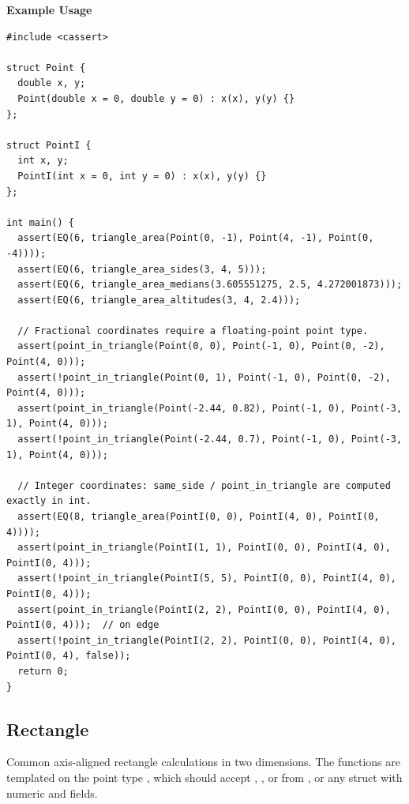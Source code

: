 \textbf{Example Usage}\par
\begin{lstlisting}[style=cpp]
#include <cassert>

struct Point {
  double x, y;
  Point(double x = 0, double y = 0) : x(x), y(y) {}
};

struct PointI {
  int x, y;
  PointI(int x = 0, int y = 0) : x(x), y(y) {}
};

int main() {
  assert(EQ(6, triangle_area(Point(0, -1), Point(4, -1), Point(0, -4))));
  assert(EQ(6, triangle_area_sides(3, 4, 5)));
  assert(EQ(6, triangle_area_medians(3.605551275, 2.5, 4.272001873)));
  assert(EQ(6, triangle_area_altitudes(3, 4, 2.4)));

  // Fractional coordinates require a floating-point point type.
  assert(point_in_triangle(Point(0, 0), Point(-1, 0), Point(0, -2), Point(4, 0)));
  assert(!point_in_triangle(Point(0, 1), Point(-1, 0), Point(0, -2), Point(4, 0)));
  assert(point_in_triangle(Point(-2.44, 0.82), Point(-1, 0), Point(-3, 1), Point(4, 0)));
  assert(!point_in_triangle(Point(-2.44, 0.7), Point(-1, 0), Point(-3, 1), Point(4, 0)));

  // Integer coordinates: same_side / point_in_triangle are computed exactly in int.
  assert(EQ(8, triangle_area(PointI(0, 0), PointI(4, 0), PointI(0, 4))));
  assert(point_in_triangle(PointI(1, 1), PointI(0, 0), PointI(4, 0), PointI(0, 4)));
  assert(!point_in_triangle(PointI(5, 5), PointI(0, 0), PointI(4, 0), PointI(0, 4)));
  assert(point_in_triangle(PointI(2, 2), PointI(0, 0), PointI(4, 0), PointI(0, 4)));  // on edge
  assert(!point_in_triangle(PointI(2, 2), PointI(0, 0), PointI(4, 0), PointI(0, 4), false));
  return 0;
}
\end{lstlisting}
\subsection{Rectangle}
\label{sec:7.1.5}
Common axis-aligned rectangle calculations in two dimensions. The functions are templated on the point type , which should accept , , or  from , or any struct with numeric  and  fields.

